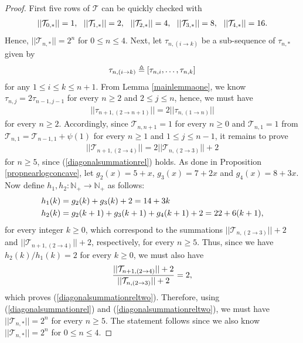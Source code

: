 \documentclass[a4paper,12pt]{article}
\def\N{\mathbb{N}}
\def\T{\mathcal{T}}
\begin{document}
\begin{proof}
First five rows of $\T$ can be quickly checked with 
\begin{align}
||\T_{0,*}|| = 1, \,\,\,\, ||\T_{1,*}|| = 2, \,\,\,\, ||\T_{2,*}|| = 4, \,\,\,\, ||\T_{3,*}|| = 8, \,\,\,\, ||\T_{4,*}|| = 16. \notag 
\end{align}
Hence, $||\T_{n,*}|| = 2^{n}$ for $0 \leq n \leq 4$. Next, let $\tau_{n,(i\rightarrow k)}$ be a sub-sequence of $\tau_{n,*}$ given by
\begin{align}
\tau_{n,(i\rightarrow k)} \triangleq [\tau_{n,i},\ldots,\tau_{n,k}] \notag
\end{align}
for any $1 \leq i \leq k \leq n + 1$. From Lemma \ref{mainlemmaone}, we know $\tau_{n,j} = 2 \tau_{n-1,j-1}$ for every $n \geq 2$ and $2 \leq j \leq n$, hence, we must have
\begin{align}
||\tau_{n+1,(2\rightarrow n+1)}|| = 2||\tau_{n,(1\rightarrow n)}|| \label{diagonalsummationrel}
\end{align}
for every $n \geq 2$. Accordingly, since $\T_{n,n+1} = 1$ for every $n\geq 0$ and $\T_{n,1} = 1$ from $\T_{n,1} = \T_{n-1,1} + \psi(1)$ for every $n \geq 1$ and $1 \leq j \leq n-1$, it remains to prove
\begin{align}
||\T_{n+1,(2\rightarrow 4)}|| = 2 ||\T_{n,(2\rightarrow 3)}|| + 2 \label{diagonalsummationreltwo}
\end{align}
for $n\geq 5$, since (\ref{diagonalsummationrel}) holds. As done in Proposition \ref{propnearlogconcave}, let $g_2(x) = 5 + x$, $g_3(x) = 7 + 2x$ and $g_4(x) = 8 + 3x$. Now define $h_1,h_2 : \N_+ \rightarrow \N_+$ as follows:
\begin{align}
&h_1(k) = g_2(k) + g_3(k) + 2 = 14 + 3k \notag \\
&h_2(k) = g_2(k+1) + g_3(k+1) + g_4(k+1) + 2 = 22 + 6(k+1), \notag
\end{align}
for every integer $k\geq 0$, which correspond to the summations $||\T_{n,(2\rightarrow 3)}|| + 2$ and $||\T_{n+1,(2\rightarrow 4)}|| + 2$, respectively, for every $n\geq 5$. Thus, since we have $h_2(k) / h_1(k) = 2$ for every $k\geq 0$, we must also have
\begin{align}
\frac{||\T_{n+1,(2\rightarrow 4)}|| + 2}{||\T_{n,(2\rightarrow 3)}|| + 2} = 2, \notag
\end{align}
which proves (\ref{diagonalsummationreltwo}). Therefore, using (\ref{diagonalsummationrel}) and (\ref{diagonalsummationreltwo}), we must have $||\T_{n,*}|| = 2^{n}$ for every $n\geq 5$. The statement follows since we also know $||\T_{n,*}|| = 2^{n}$ for $0 \leq n \leq 4$.
\end{proof}
\end{document}
